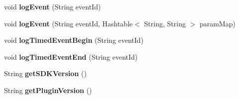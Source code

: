 \begin{DoxyCompactItemize}
\item 
\mbox{\label{classorg_1_1cocos2dx_1_1plugin_1_1AnalyticsUmeng_a6a3e1eb247f9043645a7d183bda2d516}} 
void {\bfseries log\+Event} (String event\+Id)
\item 
\mbox{\label{classorg_1_1cocos2dx_1_1plugin_1_1AnalyticsUmeng_a5a1844e20a05623a030dd750051d4565}} 
void {\bfseries log\+Event} (String event\+Id, Hashtable$<$ String, String $>$ param\+Map)
\item 
\mbox{\label{classorg_1_1cocos2dx_1_1plugin_1_1AnalyticsUmeng_a5ffc27f06e76f9e9a80884f21cddc009}} 
void {\bfseries log\+Timed\+Event\+Begin} (String event\+Id)
\item 
\mbox{\label{classorg_1_1cocos2dx_1_1plugin_1_1AnalyticsUmeng_ae539969b66217f009eb8f852d66d3764}} 
void {\bfseries log\+Timed\+Event\+End} (String event\+Id)
\item 
\mbox{\label{classorg_1_1cocos2dx_1_1plugin_1_1AnalyticsUmeng_adffffcf564a620d7b9a34812a097eff0}} 
String {\bfseries get\+S\+D\+K\+Version} ()
\item 
\mbox{\label{classorg_1_1cocos2dx_1_1plugin_1_1AnalyticsUmeng_aaec33c2253364e5674a6b662ea2e0af6}} 
String {\bfseries get\+Plugin\+Version} ()
\end{DoxyCompactItemize}
